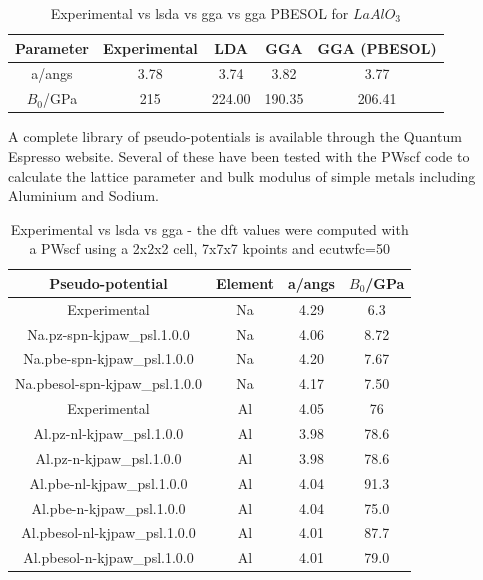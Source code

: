 \begin{table}[h]
\begin{center}
\renewcommand{\arraystretch}{1.2}
\begin{tabular}{c c c c c}
\hline\hline
Parameter & Experimental & LDA & GGA & GGA (PBESOL) \\
\hline\hline
a/angs & 3.78 & 3.74 & 3.82 & 3.77 \\
$B_0$/GPa & 215 & 224.00 & 190.35 & 206.41 \\
\hline\hline
\end{tabular}
\end{center}
\caption{Experimental vs \acrshort{lsda} vs \acrshort{gga} vs \acrshort{gga} PBESOL for $LaAlO_3$\cite{laalo3gga}}
\label{table:ldaggalaal03}
\end{table}

A complete library of pseudo-potentials is available through the Quantum Espresso website.  Several of these have been tested with the PWscf code to calculate the lattice parameter and bulk modulus of simple metals including Aluminium and Sodium.

\begin{table}[h]
\begin{center}
\renewcommand{\arraystretch}{1.2}
\begin{tabular}{c c c c}
\hline\hline
Pseudo-potential & Element & a/angs & $B_0$/GPa \\
\hline\hline
Experimental    & Na      & 4.29\cite{periodictablena} & 6.3\cite{periodictablena} \\
Na.pz-spn-kjpaw\_psl.1.0.0 & Na & 4.06 & 8.72 \\
Na.pbe-spn-kjpaw\_psl.1.0.0 & Na & 4.20 & 7.67 \\
Na.pbesol-spn-kjpaw\_psl.1.0.0 & Na & 4.17 & 7.50 \\
Experimental    & Al      & 4.05\cite{periodictableal} & 76\cite{periodictableal} \\
Al.pz-nl-kjpaw\_psl.1.0.0 & Al & 3.98 & 78.6 \\
Al.pz-n-kjpaw\_psl.1.0.0 & Al & 3.98 & 78.6 \\
Al.pbe-nl-kjpaw\_psl.1.0.0 & Al & 4.04 & 91.3 \\
Al.pbe-n-kjpaw\_psl.1.0.0 & Al & 4.04 & 75.0 \\
Al.pbesol-nl-kjpaw\_psl.1.0.0 & Al & 4.01 & 87.7 \\
Al.pbesol-n-kjpaw\_psl.1.0.0 & Al & 4.01 & 79.0 \\
\hline\hline
\end{tabular}
\end{center}
\caption{Experimental vs \acrshort{lsda} vs \acrshort{gga} - the \acrshort{dft} values were computed with a PWscf\cite{quantumespresso} using a 2x2x2 cell, 7x7x7 kpoints and ecutwfc=50}
\label{table:ggavslsda}
\end{table}


